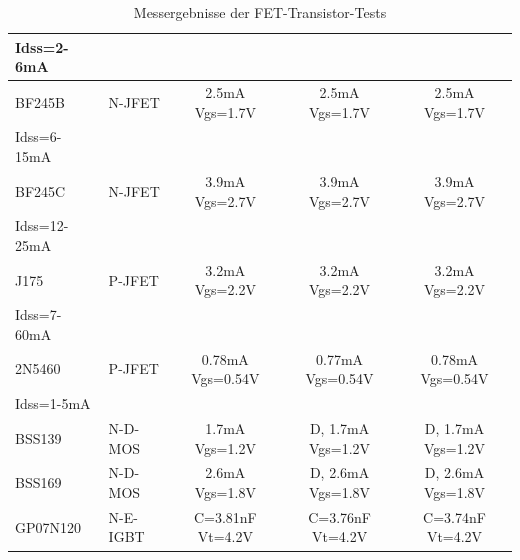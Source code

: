 \begin{table}[H]
\begin{center}
\begin{tabular}{| l | l | c | c | c |}
Idss=2-6mA   &         &                  &                  &              \\
    \hline
BF245B       & N-JFET  & 2.5mA Vgs=1.7V   & 2.5mA Vgs=1.7V   & 2.5mA Vgs=1.7V \\
Idss=6-15mA  &         &                  &                  &              \\
    \hline
BF245C       & N-JFET  & 3.9mA Vgs=2.7V   & 3.9mA Vgs=2.7V   & 3.9mA Vgs=2.7V \\
Idss=12-25mA &         &                  &                  &              \\
    \hline
J175        & P-JFET   & 3.2mA Vgs=2.2V   & 3.2mA Vgs=2.2V   & 3.2mA Vgs=2.2V \\
Idss=7-60mA &          &                  &                  &              \\
    \hline
2N5460      & P-JFET   & 0.78mA Vgs=0.54V & 0.77mA Vgs=0.54V & 0.78mA Vgs=0.54V \\
Idss=1-5mA  &          &                  &                  &              \\
    \hline
BSS139      & N-D-MOS  & 1.7mA Vgs=1.2V  & D, 1.7mA Vgs=1.2V & D, 1.7mA Vgs=1.2V \\
    \hline
BSS169      & N-D-MOS  & 2.6mA Vgs=1.8V  & D, 2.6mA Vgs=1.8V & D, 2.6mA Vgs=1.8V \\
    \hline
GP07N120    & N-E-IGBT & C=3.81nF Vt=4.2V & C=3.76nF Vt=4.2V & C=3.74nF Vt=4.2V \\
    \hline
    \end{tabular}
  \end{center}
  \caption{Messergebnisse der FET-Transistor-Tests}
  \label{tab:mos} 
\end{table}
